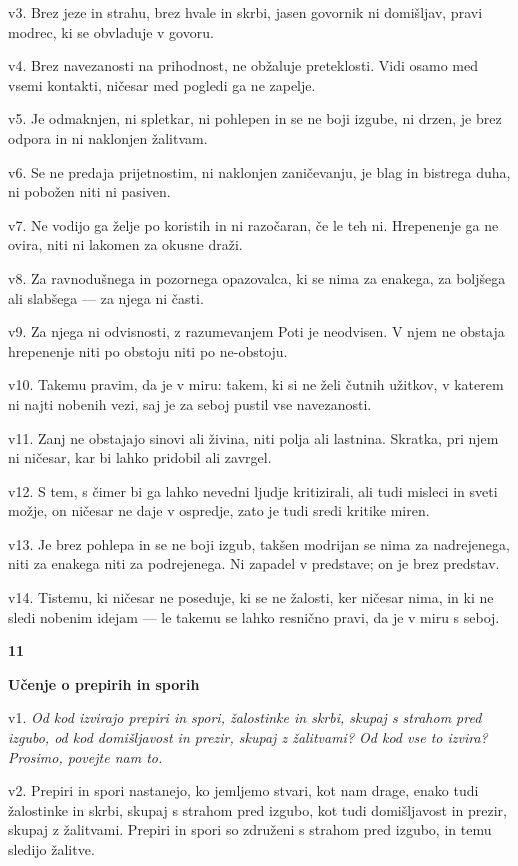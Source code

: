 v3. Brez jeze in strahu, brez hvale in skrbi, jasen govornik ni domišljav, pravi modrec, ki se obvladuje v govoru.

v4. Brez navezanosti na prihodnost, ne obžaluje preteklosti. Vidi osamo med vsemi kontakti, ničesar med pogledi ga ne zapelje.

v5. Je odmaknjen, ni spletkar, ni pohlepen in se ne boji izgube, ni drzen, je brez odpora in ni naklonjen žalitvam.

v6. Se ne predaja prijetnostim, ni naklonjen zaničevanju, je blag in bistrega duha, ni pobožen niti ni pasiven.

v7. Ne vodijo ga želje po koristih in ni razočaran, če le teh ni. Hrepenenje ga ne ovira, niti ni lakomen za okusne draži.

v8. Za ravnodušnega in pozornega opazovalca, ki se nima za enakega, za boljšega ali slabšega --- za njega ni časti.

v9. Za njega ni odvisnosti, z razumevanjem Poti je neodvisen. V njem ne obstaja hrepenenje niti po obstoju niti po ne-obstoju.

v10. Takemu pravim, da je v miru: takem, ki si ne želi čutnih užitkov, v katerem ni najti nobenih vezi, saj je za seboj pustil vse navezanosti.

v11. Zanj ne obstajajo sinovi ali živina, niti polja ali lastnina. Skratka, pri njem ni ničesar, kar bi lahko pridobil ali zavrgel.

v12. S tem, s čimer bi ga lahko nevedni ljudje kritizirali, ali tudi misleci in sveti možje, on ničesar ne daje v ospredje, zato je tudi sredi kritike miren.

v13. Je brez pohlepa in se ne boji izgub, takšen modrijan se nima za nadrejenega, niti za enakega niti za podrejenega. Ni zapadel v predstave; on je brez predstav.

v14. Tistemu, ki ničesar ne poseduje, ki se ne žalosti, ker ničesar nima, in ki ne sledi nobenim idejam --- le takemu se lahko resnično pravi, da je v miru s seboj.

\textbf{11 }

\textbf{Učenje o prepirih in sporih }

v1. \emph{Od kod izvirajo prepiri in spori, žalostinke in skrbi, skupaj s strahom pred izgubo, od kod domišljavost in prezir, skupaj z žalitvami? Od kod vse to izvira? Prosimo, povejte nam to.}

v2. Prepiri in spori nastanejo, ko jemljemo stvari, kot nam drage, enako tudi žalostinke in skrbi, skupaj s strahom pred izgubo, kot tudi domišljavost in prezir, skupaj z žalitvami. Prepiri in spori so združeni s strahom pred izgubo, in temu sledijo žalitve.

